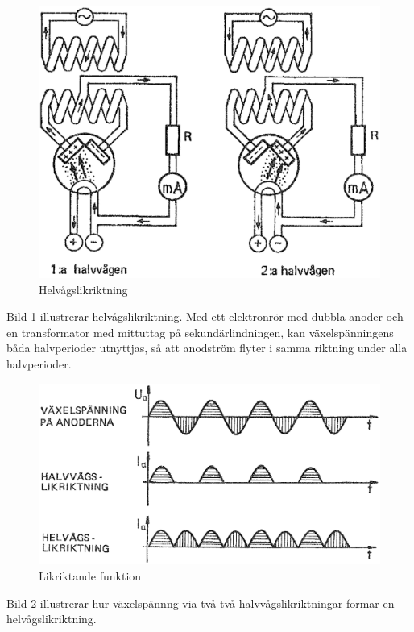 \begin{figure}
\includegraphics[width=\textwidth]{images/cropped_pdfs/bild_2_2-28.pdf}
\caption{Helvågslikriktning}
\label{fig:BildII2-28}
\end{figure}

Bild \ref{fig:BildII2-28} illustrerar helvågslikriktning.
Med ett elektronrör med dubbla anoder och en transformator med mittuttag på
sekundärlindningen, kan växelspänningens båda halvperioder utnyttjas, så att
anodström flyter i samma riktning under alla halvperioder.

\begin{figure}
\includegraphics[width=\textwidth]{images/cropped_pdfs/bild_2_2-29.pdf}
\caption{Likriktande funktion}
\label{fig:BildII2-29}
\end{figure}

Bild \ref{fig:BildII2-29} illustrerar hur växelspännng via två
två halvvågslikriktningar formar en helvågslikriktning.

